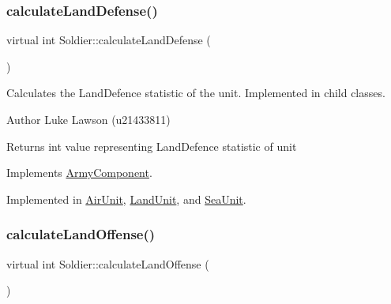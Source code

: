 \mbox{\label{class_soldier_ab37165b4ce8fbe4a24a759c81ece58c4}} 
\subsubsection{\texorpdfstring{calculateLandDefense()}{calculateLandDefense()}}
{\footnotesize\ttfamily virtual int Soldier\+::calculate\+Land\+Defense (\begin{DoxyParamCaption}{ }\end{DoxyParamCaption})\hspace{0.3cm}{\ttfamily [pure virtual]}}



Calculates the Land\+Defence statistic of the unit. Implemented in child classes. 

\begin{DoxyAuthor}{Author}
Luke Lawson (u21433811) 
\end{DoxyAuthor}
\begin{DoxyReturn}{Returns}
int value representing Land\+Defence statistic of unit 
\end{DoxyReturn}


Implements \mbox{\hyperlink{class_army_component_a88558b28106a5d461fcc9ca2eb8e7a40}{Army\+Component}}.



Implemented in \mbox{\hyperlink{class_air_unit_a5d408669d099d55d1bb19f71d6dc8712}{Air\+Unit}}, \mbox{\hyperlink{class_land_unit_acffd7525b2d214be433fe77ecf5610df}{Land\+Unit}}, and \mbox{\hyperlink{class_sea_unit_a5fa9cb7bedbe58346fcd22fdd7ca855b}{Sea\+Unit}}.

\mbox{\label{class_soldier_ac0add7efb3192adb809bc1746c880fc0}} 
\subsubsection{\texorpdfstring{calculateLandOffense()}{calculateLandOffense()}}
{\footnotesize\ttfamily virtual int Soldier\+::calculate\+Land\+Offense (\begin{DoxyParamCaption}{ }\end{DoxyParamCaption})\hspace{0.3cm}{\ttfamily [pure virtual]}}



